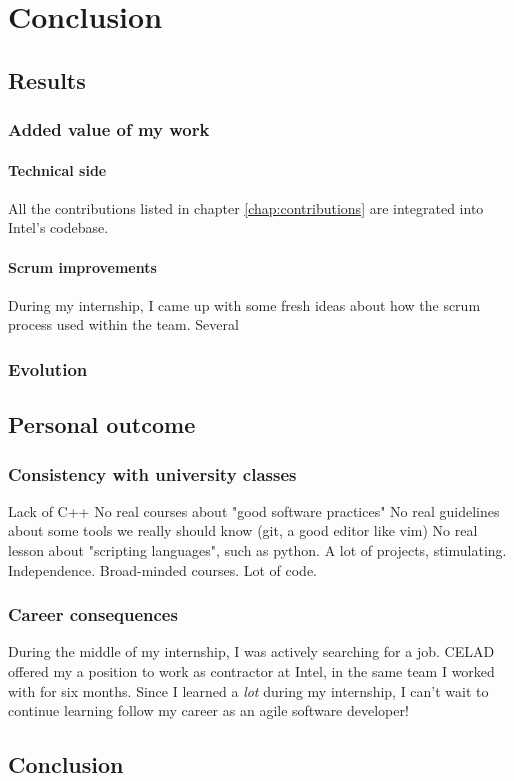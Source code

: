 \chapter{Conclusion}

\section{Results}

\subsection{Added value of my work}
\subsubsection{Technical side}
All the contributions listed in chapter \ref{chap:contributions} are integrated into Intel's codebase.
\subsubsection{Scrum improvements}
During my internship, I came up with some fresh ideas about how the \gls{scrum} process used within the team.
Several

\subsection{Evolution}

\section{Personal outcome}

\subsection{Consistency with university classes}
Lack of C++
No real courses about "good software practices"
No real guidelines about some tools we really should know (\gls{git}, a good editor like \gls{vim})
No real lesson about "scripting languages", such as python.
A lot of projects, stimulating. Independence. Broad-minded courses.
Lot of code.


\subsection{Career consequences}
During the middle of my internship, I was actively searching for a job. CELAD offered my a position to work
as contractor at Intel, in the same team I worked with for six months.
Since I learned a \emph{lot} during my internship, I can't wait to continue learning follow my career
as an agile software developer!

\section{Conclusion}
